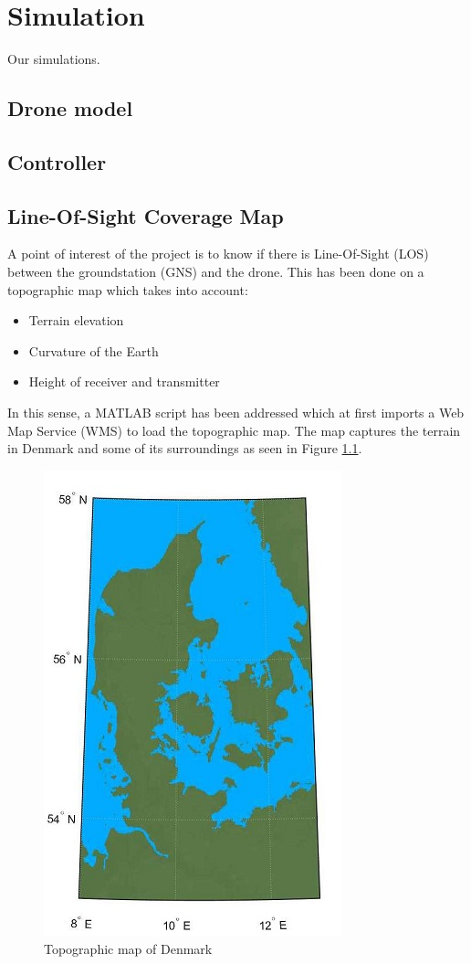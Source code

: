 \chapter{Simulation}\label{ch:simulation}
Our simulations.

\section{Drone model}

\section{Controller}

\section{Line-Of-Sight Coverage Map}

A point of interest of the project is to know if there is Line-Of-Sight (LOS) between the groundstation (GNS) and the drone. This has been done on a topographic map which takes into account:

\begin{itemize}
	\item Terrain elevation
	\item Curvature of the Earth
	\item Height of receiver and transmitter
\end{itemize}

In this sense, a MATLAB script has been addressed which at first imports a Web Map Service (WMS) to load the topographic map. The map captures the terrain in Denmark and some of its surroundings as seen in Figure \ref{fig:dk_map}.

\begin{figure}[h]
	\centering
	\includegraphics[scale=2]{figures/denmark.jpg}
	\caption{Topographic map of Denmark}
   	\label{fig:dk_map}
\end{figure}

